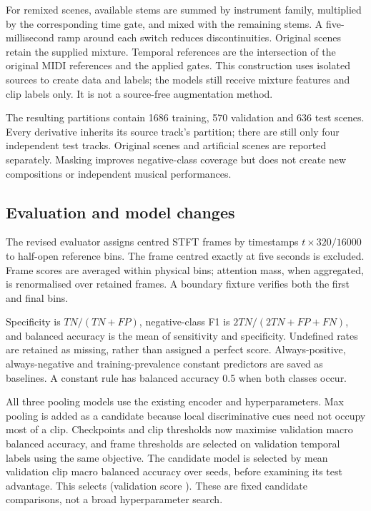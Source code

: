 \documentclass[10pt,a4paper]{article}
\begin{document}
For remixed scenes, available stems are summed by instrument family, multiplied by the corresponding time gate, and mixed with the remaining stems. A five-millisecond ramp around each switch reduces discontinuities. Original scenes retain the supplied mixture. Temporal references are the intersection of the original MIDI references and the applied gates. This construction uses isolated sources to create data and labels; the models still receive mixture features and clip labels only. It is not a source-free augmentation method.

The resulting partitions contain 1686 training, 570 validation and 636 test scenes. Every derivative inherits its source track's partition; there are still only four independent test tracks. Original scenes and artificial scenes are reported separately. Masking improves negative-class coverage but does not create new compositions or independent musical performances.

\subsection{Evaluation and model changes}
The revised evaluator assigns centred STFT frames by timestamps $t\times320/16000$ to half-open reference bins. The frame centred exactly at five seconds is excluded. Frame scores are averaged within physical bins; attention mass, when aggregated, is renormalised over retained frames. A boundary fixture verifies both the first and final bins.

Specificity is $TN/(TN+FP)$, negative-class F1 is $2TN/(2TN+FP+FN)$, and balanced accuracy is the mean of sensitivity and specificity. Undefined rates are retained as missing, rather than assigned a perfect score. Always-positive, always-negative and training-prevalence constant predictors are saved as baselines. A constant rule has balanced accuracy 0.5 when both classes occur.

All three pooling models use the existing encoder and hyperparameters. Max pooling is added as a candidate because local discriminative cues need not occupy most of a clip. Checkpoints and clip thresholds now maximise validation macro balanced accuracy, and frame thresholds are selected on validation temporal labels using the same objective. The candidate model is selected by mean validation clip macro balanced accuracy over seeds, before examining its test advantage. This selects \SelectedModel{} (validation score \SelectedValidationBA{}). These are fixed candidate comparisons, not a broad hyperparameter search.
\end{document}
